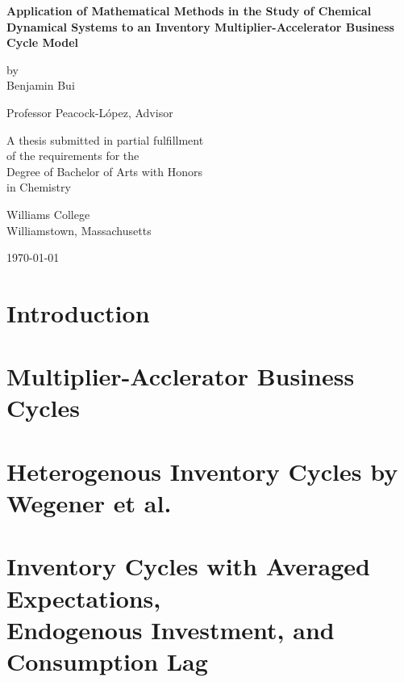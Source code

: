 \documentclass[12pt,twoside]{report}
\begin{document}
\begin{titlepage}
	\begin{center}
		\vspace*{1.5 cm}
		\textbf{Application of Mathematical Methods in the Study of Chemical Dynamical Systems to an Inventory Multiplier-Accelerator Business Cycle Model}


		\vspace{1.5 cm}

		by\\ Benjamin Bui
		\vspace{1.5 cm}

		Professor Peacock-L\'opez, Advisor
		\vspace{1.5 cm}

		A thesis submitted in partial fulfillment\\
		of the requirements for the\\
		Degree of Bachelor of Arts with Honors\\
		in Chemistry
		\vspace{1.5 cm}

		Williams College\\
		Williamstown, Massachusetts
		\vspace{1.5 cm}

		\today
	\end{center}
\end{titlepage}




\tableofcontents
\chapter{Introduction}

\chapter{Multiplier-Acclerator Business Cycles}\label{ch:multiplier-accelerator}

\chapter{Heterogenous Inventory Cycles by Wegener et al.}

\chapter{Inventory Cycles with Averaged Expectations,\\ Endogenous Investment, and Consumption Lag}\label{ch:metzlerian-expanded}

\end{document}
